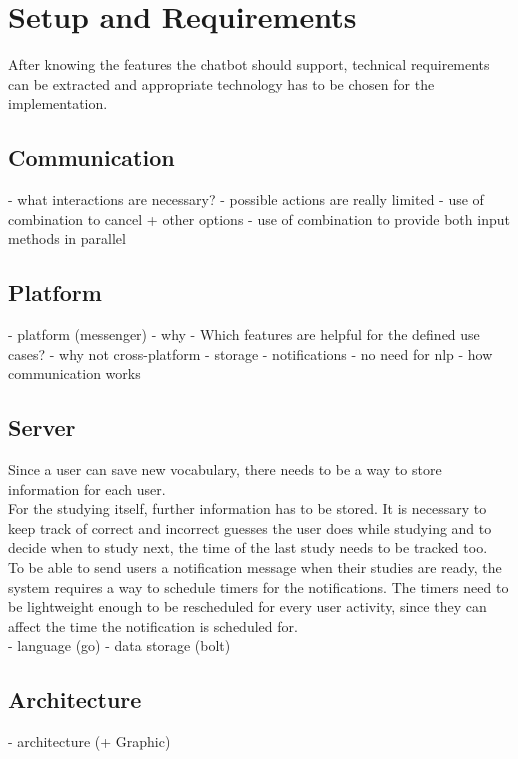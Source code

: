 \section{Setup and Requirements}

After knowing the features the chatbot should support,
technical requirements can be extracted
and appropriate technology has to be chosen for the implementation.


\subsection{Communication}

- what interactions are necessary?
- possible actions are really limited
- use of combination to cancel + other options
- use of combination to provide both input methods in parallel


\subsection{Platform}

- platform (messenger)
  - why
    - Which features are helpful for the defined use cases?
  - why not cross-platform
    - storage
    - notifications
    - no need for nlp
  - how communication works


\subsection{Server}

Since a user can save new vocabulary,
there needs to be a way to store information for each user.
\\
For the studying itself, further information has to be stored.
It is necessary to keep track of correct and incorrect guesses the user does while studying
and to decide when to study next, the time of the last study needs to be tracked too.
\\

To be able to send users a notification message when their studies are ready,
the system requires a way to schedule timers for the notifications.
The timers need to be lightweight enough to be rescheduled for every user activity,
since they can affect the time the notification is scheduled for.
\\


- language (go)
- data storage (bolt)


\subsection{Architecture}

- architecture (+ Graphic)
